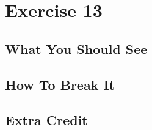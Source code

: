 \chapter{Exercise 13}


\section{What You Should See}


\section{How To Break It}


\section{Extra Credit}



